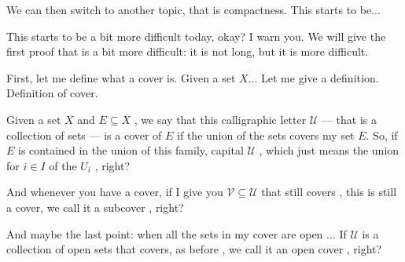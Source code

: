 \begin{speech}[00:46:20 - 00:48:31]
We can then switch to another topic, that is compactness. This starts to be... 

This starts to be a bit more difficult today, okay? I warn you. We will give the first proof that is a bit more difficult: it is not long, but it is more difficult.

First, let me define what a cover is. Given a set $X$... Let me give a definition.  Definition of cover.

Given a set $X$  and $E \subseteq X$ , we say that  this calligraphic letter $\mathcal{U}$  --- that is a collection of sets  --- is a cover of $E$  if the union of the sets covers my set $E$. So, if $E$ is contained in the union of this family, capital $\mathcal{U}$ , which just means the union for $i \in I$ of the $U_i$ , right?
\end{speech}

\begin{speech}[00:48:31 - 00:49:50]
And whenever you have a cover, if I give you $\mathcal{V} \subseteq \mathcal{U}$ that still covers  , this is still a cover, we call it a subcover , right?

And maybe the last point: when all the sets in my cover are open ... If $\mathcal{U}$ is a collection of open sets that covers, as before , we call it an open cover , right?
\end{speech}


